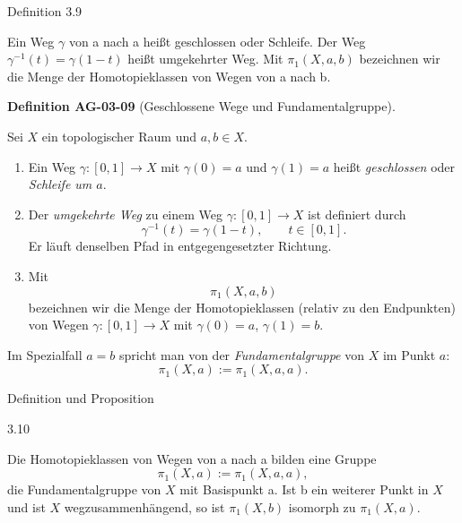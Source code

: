 \documentclass[10pt, letterpaper]{article}
\newcommand{\CustomHeading}[3]{%
  \par\medskip\noindent%
  \textbf{#1 #2} \textnormal{(#3)}.\enskip%
}
\newenvironment{DEF}[2]{\begin{unitbox}\CustomHeading{Definition}{#1}{#2}}{\end{unitbox}}
\begin{document}
Definition 3.9 

Ein Weg $\gamma$ von a nach a heißt geschlossen oder Schleife. Der Weg $\gamma^{-1}(t)=\gamma(1-t)$ heißt umgekehrter Weg. Mit $\pi_{1}(X, a, b)$ bezeichnen wir die Menge der Homotopieklassen von Wegen von a nach b.

\begin{DEF}{AG-03-09}{Geschlossene Wege und Fundamentalgruppe}
Sei \(X\) ein topologischer Raum und \(a,b\in X\).

\begin{enumerate}
\item Ein Weg \(\gamma:[0,1]\to X\) mit \(\gamma(0)=a\) und \(\gamma(1)=a\) 
      heißt \emph{geschlossen} oder \emph{Schleife um \(a\)}.
\item Der \emph{umgekehrte Weg} zu einem Weg \(\gamma:[0,1]\to X\) ist definiert durch
      \[
      \gamma^{-1}(t)=\gamma(1-t), \qquad t\in[0,1].
      \]
      Er läuft denselben Pfad in entgegengesetzter Richtung.
\item Mit
      \[
      \pi_1(X,a,b)
      \]
      bezeichnen wir die Menge der Homotopieklassen (relativ zu den Endpunkten)
      von Wegen \(\gamma:[0,1]\to X\) mit \(\gamma(0)=a\), \(\gamma(1)=b\).
\end{enumerate}
Im Spezialfall \(a=b\) spricht man von der \emph{Fundamentalgruppe} von \(X\) im Punkt \(a\):
\[
\pi_1(X,a):=\pi_1(X,a,a).
\]
\end{DEF}


Definition und Proposition 

3.10 

Die Homotopieklassen von Wegen von a nach a bilden eine Gruppe
$$
\pi_{1}(X, a):=\pi_{1}(X, a, a),
$$
die Fundamentalgruppe von $X$ mit Basispunkt a. Ist b ein weiterer Punkt in $X$ und ist $X$ wegzusammenhängend, so ist $\pi_{1}(X, b)$ isomorph zu $\pi_{1}(X, a)$.
\end{document}
